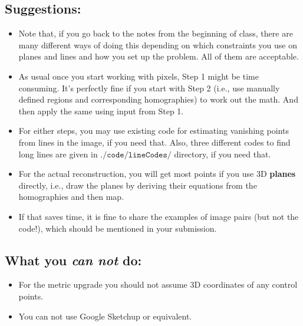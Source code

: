 \documentclass[11pt]{article}
\begin{document}
\subsection{Suggestions:}
\label{sec:sugg}
\begin{itemize}
\item Note that, if you go back to the notes from the beginning of class, there are
many different ways of doing this depending on which constraints you use
on planes and lines and how you set up the problem. All of them are
acceptable.

\item As usual once you start working with pixels, Step 1 might be time
consuming. It's perfectly fine if you start with Step 2 (i.e., use manually
defined regions and corresponding homographies) to work out the math. And then apply the same using input from Step 1.

\item For either steps, you may use existing code for estimating vanishing points
from lines in the image, if you need that. Also, three different codes to find long lines are given in $\texttt{./code/lineCodes/}$ directory, if you need that.

\item For the actual reconstruction, you will get most points if you use 3D {\bf planes} directly, i.e., draw the planes by deriving their equations from the homographies and then map.

\item If that saves time, it is fine to share the examples of image pairs (but not the code!), which should be mentioned in your submission.
\end{itemize}

\subsection{What you {\it can not} do:}
\begin{itemize}
\item For the metric upgrade you should not assume 3D coordinates of any control points.
\item You can not use Google Sketchup or equivalent.
\end{itemize}
\end{document}
